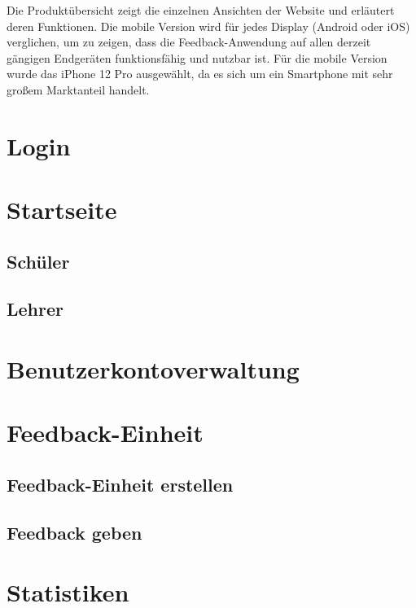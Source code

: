 Die Produktübersicht zeigt die einzelnen Ansichten der Website und erläutert deren 
Funktionen. Die mobile Version wird für jedes Display (Android oder iOS) verglichen, 
um zu zeigen, dass die Feedback-Anwendung auf allen derzeit gängigen Endgeräten 
funktionsfähig und nutzbar ist. Für die mobile Version wurde das iPhone 12 Pro 
ausgewählt, da es sich um ein Smartphone mit sehr großem Marktanteil handelt.
\newpage

\section{Login}

\section{Startseite}
\subsection{Schüler}
\subsection{Lehrer}

\section{Benutzerkontoverwaltung}

\section{Feedback-Einheit}
\subsection{Feedback-Einheit erstellen}
\subsection{Feedback geben}

\section{Statistiken}
